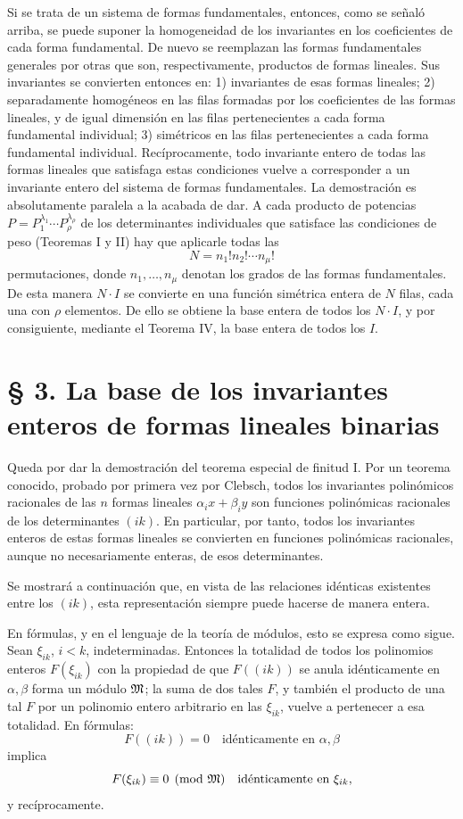 \documentclass[11pt]{article}
\begin{document}
Si se trata de un sistema de formas fundamentales, entonces, como se señaló arriba, se puede suponer la homogeneidad de los invariantes en los coeficientes de cada forma fundamental. De nuevo se reemplazan las formas fundamentales generales por otras que son, respectivamente, productos de formas lineales. Sus invariantes se convierten entonces en: 1) invariantes de esas formas lineales; 2) separadamente homogéneos en las filas formadas por los coeficientes de las formas lineales, y de igual dimensión en las filas pertenecientes a cada forma fundamental individual; 3) simétricos en las filas pertenecientes a cada forma fundamental individual. Recíprocamente, todo invariante entero de todas las formas lineales que satisfaga estas condiciones vuelve a corresponder a un invariante entero del sistema de formas fundamentales. La demostración es absolutamente paralela a la acabada de dar. A cada producto de potencias \(P=P_1^{\lambda_1}\cdots P_\rho^{\lambda_\rho}\) de los determinantes individuales que satisface las condiciones de peso (Teoremas I y II) hay que aplicarle todas las
\[
        N=n_1!n_2!\cdots n_\mu!
\]
permutaciones, donde \(n_1,\ldots,n_\mu\) denotan los grados de las formas fundamentales. De esta manera \(N\cdot I\) se convierte en una función simétrica entera de \(N\) filas, cada una con \(\rho\) elementos. De ello se obtiene la base entera de todos los \(N\cdot I\), y por consiguiente, mediante el Teorema IV, la base entera de todos los \(I\).

\setcounter{equation}{0}
\section*{§ 3. La base de los invariantes enteros de formas lineales binarias}

Queda por dar la demostración del teorema especial de finitud I. Por un teorema conocido, probado por primera vez por Clebsch, todos los invariantes polinómicos racionales de las \(n\) formas lineales \(\alpha_i x+\beta_i y\) son funciones polinómicas racionales de los determinantes \((ik)\). En particular, por tanto, todos los invariantes enteros de estas formas lineales se convierten en funciones polinómicas racionales, aunque no necesariamente enteras, de esos determinantes.

Se mostrará a continuación que, en vista de las relaciones idénticas existentes entre los \((ik)\), esta representación siempre puede hacerse de manera entera.

En fórmulas, y en el lenguaje de la teoría de módulos, esto se expresa como sigue. Sean \(\xi_{ik}\), \(i<k\), indeterminadas. Entonces la totalidad de todos los polinomios enteros \(F(\xi_{ik})\) con la propiedad de que \(F((ik))\) se anula idénticamente en \(\alpha,\beta\) forma un módulo \(\mathfrak M\); la suma de dos tales \(F\), y también el producto de una tal \(F\) por un polinomio entero arbitrario en las \(\xi_{ik}\), vuelve a pertenecer a esa totalidad. En fórmulas:
\[
        F((ik))=0\quad \text{idénticamente en \(\alpha,\beta\)}
\]
implica
\[
        F(\xi_{ik})\equiv0\pmod{\mathfrak M}\quad \text{idénticamente en \(\xi_{ik}\)},
\]
y recíprocamente.
\end{document}
